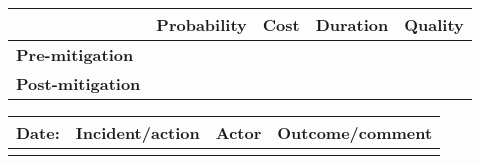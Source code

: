\begin{table}
\begin{tabularx}{\textwidth}{| X |}
	\end{tabularx}
	\begin{tabularx}{\textwidth}{| l | l | X | X | X |}
		\hline
		 &  \textbf{Probability} & \textbf{Cost} & \textbf{Duration} & \textbf{Quality} \\ \hline
		\textbf{Pre-mitigation} & & & & \\ \hline
		\textbf{Post-mitigation} & & & & \\ \hline \hline
	\end{tabularx}
	\begin{tabularx}{\textwidth}{| l | X | l | X |}
		\hline
		\textbf{Date:} & \textbf{Incident/action} & \textbf{Actor} & \textbf{Outcome/comment} \\ \hline
		 &  &  &  \\ \hline
	\end{tabularx}
\end{table}

